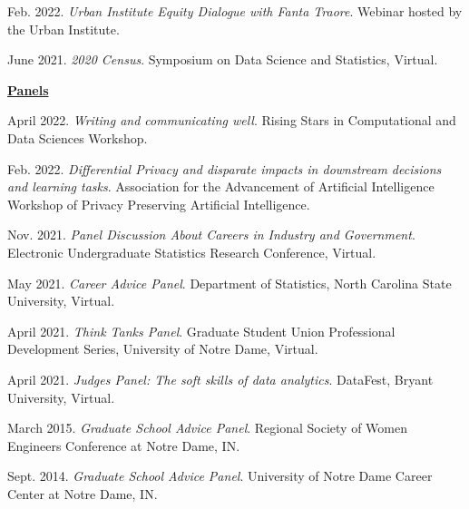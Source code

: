 \documentclass[11pt, letterpaper, roman]{moderncv} %
\begin{document}
\begin{etaremune}[topsep=0pt, itemsep=4pt, partopsep=0pt, parsep=0pt]
    \item Feb. 2022. \textit{Urban Institute Equity Dialogue with Fanta Traore}. Webinar hosted by the Urban Institute.
    
    \item June 2021. \textit{2020 Census}. Symposium on Data Science and Statistics, Virtual.
    
    \vspace{6pt}
\hspace{-0.30in}\underline{\textbf{\large Panels}}\normalsize
    \item April 2022. \textit{Writing and communicating well}. Rising Stars in Computational and Data Sciences Workshop.

    \item Feb. 2022. \textit{Differential Privacy and disparate impacts in downstream decisions and learning tasks}. Association for the Advancement of Artificial Intelligence Workshop of Privacy Preserving Artificial Intelligence.
    
    \item Nov. 2021. \textit{Panel Discussion About Careers in Industry and Government}. Electronic Undergraduate Statistics Research Conference, Virtual.

    \item May 2021. \textit{Career Advice Panel}. Department of Statistics, North Carolina State University, Virtual.
    
    \item April 2021. \textit{Think Tanks Panel}. Graduate Student Union Professional Development Series, University of Notre Dame, Virtual.
    
    \item April 2021. \textit{Judges Panel: The soft skills of data analytics}. DataFest, Bryant University, Virtual.

    \item March 2015. \textit{Graduate School Advice Panel}.  Regional Society of Women Engineers Conference at Notre Dame, IN.
    
    \item Sept. 2014. \textit{Graduate School Advice Panel}.  University of Notre Dame Career Center at Notre Dame, IN.
\end{etaremune}

\vspace{-10pt}
\end{document}
